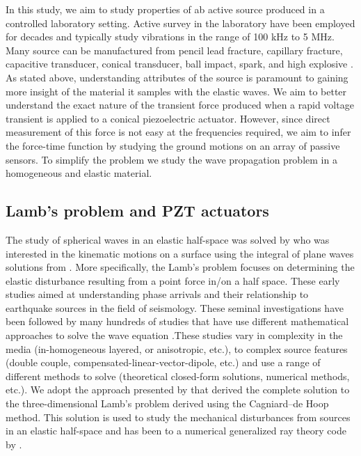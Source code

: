 \documentclass[preprint,3p, 11pt,authoryear]{elsarticle}
\begin{document}
In this study, we aim to study properties of ab active source produced in a controlled laboratory setting. Active survey in the laboratory have been employed for decades and typically study vibrations in the range of 100 kHz to 5 MHz. Many source can be manufactured from pencil lead fracture, capillary fracture, capacitive transducer, conical transducer, ball impact, spark, and high explosive \citep{Breckenridge1990}. As stated above, understanding attributes of the source is paramount to gaining more insight of the material it samples with the elastic waves. We aim to better understand the exact nature of the transient force produced when a rapid voltage transient is applied to a conical piezoelectric actuator. However, since direct measurement of this force is not easy at the frequencies required, we aim to infer the force-time function by studying the ground motions on an array of passive sensors. To simplify the problem we study the wave propagation problem in a homogeneous and elastic material.

\subsection{Lamb's problem and PZT actuators}

The study of spherical waves in an elastic half-space was solved by \citet{Lamb1904} who was interested in the kinematic motions on a surface using the integral of plane waves solutions from \citet{Rayleigh1885}. More specifically, the Lamb's problem focuses on determining the elastic disturbance resulting from a point force in/on a half space. These early studies aimed at understanding phase arrivals and their relationship to earthquake sources in the field of seismology. These seminal investigations have been followed by many hundreds of studies that have use different mathematical approaches to solve the wave equation \citep[e.g. ch 6 in][]{Aki2002}.These studies vary in complexity in the media (in-homogeneous layered, or anisotropic, etc.), to complex source features (double couple, compensated-linear-vector-dipole, etc.) and use a range of different methods to solve (theoretical closed-form solutions, numerical methods, etc.). We adopt the approach presented by \citet{Johnson1974} that derived the complete solution to the three-dimensional Lamb’s problem derived using the Cagniard--de Hoop method. This solution is used to study the mechanical disturbances from sources in an elastic half-space and has been to a numerical generalized ray theory code by \citet{Hsu1985} \citep[see also][]{McLaskey2011, McLaskey2012, Selvadurai2019}.
\end{document}
